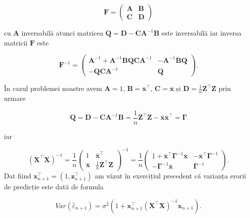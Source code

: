 \documentclass[]{article}
\begin{document}
\[
  \boldsymbol F = \begin{pmatrix}\boldsymbol A & \boldsymbol B\\ \boldsymbol C & \boldsymbol D\end{pmatrix}
\]

cu \(\boldsymbol A\) inversabilă atunci matricea
\(\boldsymbol Q = \boldsymbol D - \boldsymbol C \boldsymbol A^{-1}\boldsymbol B\)
este inversabilă iar inversa matricii \(\boldsymbol F\) este

\[
  \boldsymbol F^{-1} = \begin{pmatrix}\boldsymbol A^{-1} + \boldsymbol A^{-1}\boldsymbol B \boldsymbol Q\boldsymbol C\boldsymbol A^{-1} & -\boldsymbol A^{-1}\boldsymbol B\boldsymbol Q\\
  -\boldsymbol Q\boldsymbol C\boldsymbol A^{-1} & \boldsymbol Q\end{pmatrix}.
\]

În cazul problemei noastre avem \(\boldsymbol A = 1\),
\(\boldsymbol B = \bar{\boldsymbol x}^\intercal\),
\(\boldsymbol C = \bar{\boldsymbol x}\) și
\(\boldsymbol D = \frac{1}{n}\boldsymbol Z^\intercal\boldsymbol Z\) prin
urmare

\[
\boldsymbol Q = \boldsymbol D - \boldsymbol C \boldsymbol A^{-1}\boldsymbol B = \frac{1}{n}\boldsymbol Z^\intercal\boldsymbol Z - \bar{\boldsymbol x}\bar{\boldsymbol x}^\intercal = \boldsymbol \Gamma
\]

iar

\[
  \left(\boldsymbol X^\intercal \boldsymbol X\right)^{-1} = \frac{1}{n}\begin{pmatrix}1 & \bar{\boldsymbol x}^\intercal\\ \bar{\boldsymbol x} & \frac{1}{n}\boldsymbol Z^\intercal \boldsymbol Z\end{pmatrix}^{-1} = \frac{1}{n}\begin{pmatrix}1 + \bar{\boldsymbol x}^\intercal\boldsymbol \Gamma^{-1}\bar{\boldsymbol x} & -\bar{\boldsymbol x}^\intercal\boldsymbol \Gamma^{-1}\\ -\boldsymbol \Gamma^{-1}\bar{\boldsymbol x} & \boldsymbol \Gamma^{-1}\end{pmatrix}.
\] Dat fiind
\(\boldsymbol x_{n+1}^\intercal = (1, \boldsymbol z_{n+1}^\intercal)\)
am văzut în exercițiul precedent că varianța erorii de predicție este
dată de formula

\[
  Var(\hat{\varepsilon}_{n+1}) = \sigma^2\left(1 + \boldsymbol x_{n+1}^\intercal(\boldsymbol X^\intercal \boldsymbol X)^{-1}\boldsymbol x_{n+1}\right).
\]
\end{document}
